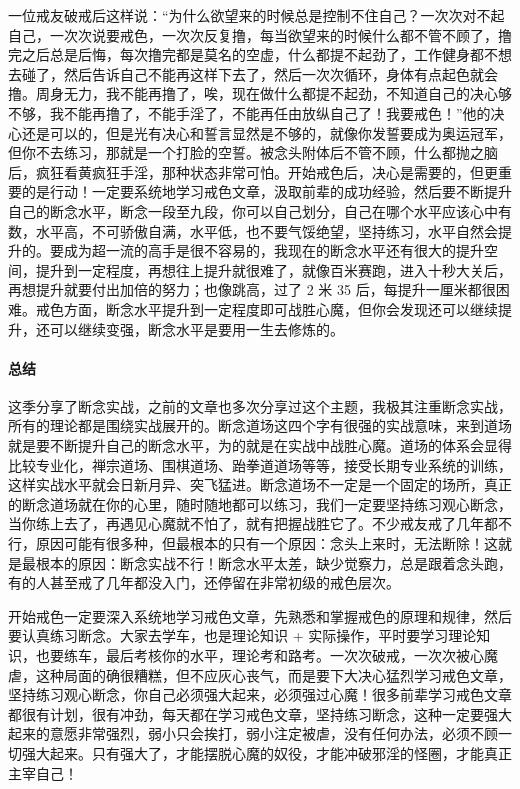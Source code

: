 一位戒友破戒后这样说：“为什么欲望来的时候总是控制不住自己？一次次对不起自己，一次次说要戒色，一次次反复撸，每当欲望来的时候什么都不管不顾了，撸完之后总是后悔，每次撸完都是莫名的空虚，什么都提不起劲了，工作健身都不想去碰了，然后告诉自己不能再这样下去了，然后一次次循环，身体有点起色就会撸。周身无力，我不能再撸了，唉，现在做什么都提不起劲，不知道自己的决心够不够，我不能再撸了，不能手淫了，不能再任由放纵自己了！我要戒色！”他的决心还是可以的，但是光有决心和誓言显然是不够的，就像你发誓要成为奥运冠军，但你不去练习，那就是一个打脸的空誓。被念头附体后不管不顾，什么都抛之脑后，疯狂看黄疯狂手淫，那种状态非常可怕。开始戒色后，决心是需要的，但更重要的是行动！一定要系统地学习戒色文章，汲取前辈的成功经验，然后要不断提升自己的断念水平，断念一段至九段，你可以自己划分，自己在哪个水平应该心中有数，水平高，不可骄傲自满，水平低，也不要气馁绝望，坚持练习，水平自然会提升的。要成为超一流的高手是很不容易的，我现在的断念水平还有很大的提升空间，提升到一定程度，再想往上提升就很难了，就像百米赛跑，进入十秒大关后，再想提升就要付出加倍的努力；也像跳高，过了 2 米 35 后，每提升一厘米都很困难。戒色方面，断念水平提升到一定程度即可战胜心魔，但你会发现还可以继续提升，还可以继续变强，断念水平是要用一生去修炼的。

\paragraph*{总结}

这季分享了断念实战，之前的文章也多次分享过这个主题，我极其注重断念实战，所有的理论都是围绕实战展开的。断念道场这四个字有很强的实战意味，来到道场就是要不断提升自己的断念水平，为的就是在实战中战胜心魔。道场的体系会显得比较专业化，禅宗道场、围棋道场、跆拳道道场等等，接受长期专业系统的训练，这样实战水平就会日新月异、突飞猛进。断念道场不一定是一个固定的场所，真正的断念道场就在你的心里，随时随地都可以练习，我们一定要坚持练习观心断念，当你练上去了，再遇见心魔就不怕了，就有把握战胜它了。不少戒友戒了几年都不行，原因可能有很多种，但最根本的只有一个原因：念头上来时，无法断除！这就是最根本的原因：断念实战不行！断念水平太差，缺少觉察力，总是跟着念头跑，有的人甚至戒了几年都没入门，还停留在非常初级的戒色层次。

开始戒色一定要深入系统地学习戒色文章，先熟悉和掌握戒色的原理和规律，然后要认真练习断念。大家去学车，也是理论知识 + 实际操作，平时要学习理论知识，也要练车，最后考核你的水平，理论考和路考。一次次破戒，一次次被心魔虐，这种局面的确很糟糕，但不应灰心丧气，而是要下大决心猛烈学习戒色文章，坚持练习观心断念，你自己必须强大起来，必须强过心魔！很多前辈学习戒色文章都很有计划，很有冲劲，每天都在学习戒色文章，坚持练习断念，这种一定要强大起来的意愿非常强烈，弱小只会挨打，弱小注定被虐，没有任何办法，必须不顾一切强大起来。只有强大了，才能摆脱心魔的奴役，才能冲破邪淫的怪圈，才能真正主宰自己！

